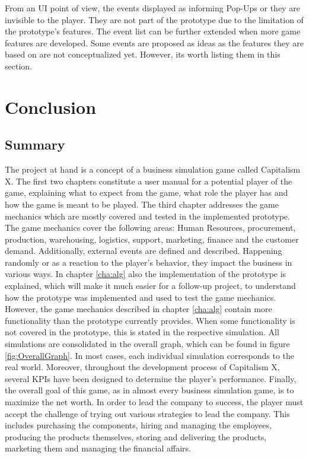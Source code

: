 \documentclass[11pt,titlepage,oneside,openany]{book}
\begin{document}
From an UI point of view, the events displayed as informing Pop-Ups or they are invisible to the player. They are not part of the prototype due to the limitation of the prototype's features. The event list can be further extended when more game features are developed. Some events are proposed as ideas as the features they are based on are not conceptualized yet. However, its worth listing them in this section. 



\chapter{Conclusion}
\label{sec:conclusion}

\section{Summary}
\label{sec:summary}
The project at hand is a concept of a business simulation game called Capitalism X. The first two chapters constitute a user manual for a potential player of the game, explaining what to expect from the  game, what role the player has and how the game is meant to be played. The third chapter addresses the game mechanics which are mostly covered and tested in the implemented prototype. The game mechanics cover the following areas: Human Resources, procurement, production, warehousing, logistics, support, marketing, finance and the customer demand. Additionally, external events are defined and described. Happening randomly or as a reaction to the player's behavior, they impact the business in various ways. 
In chapter \ref{cha:alg} also the implementation of the prototype is explained, which will make it much easier for a follow-up project, to understand how the prototype was implemented and used to test the game mechanics. 
However, the game mechanics described in chapter \ref{cha:alg} contain more functionality than the prototype currently provides. When some functionality is not covered in the prototype, this is stated in the respective simulation. All simulations are consolidated in the overall graph, which can be found in figure \ref{fig:OverallGraph}. In most cases, each individual simulation corresponds to the real world.
Moreover, throughout the development process of Capitalism X, several KPIs have been designed to determine the player's performance. Finally, the overall goal of this game, as in almost every business simulation game, is to maximize the net worth. In order to lead the company to success, the player must accept the challenge of trying out various strategies to lead the company. This includes purchasing the components, hiring and managing the employees, producing the products themselves, storing and delivering the products, marketing them and managing the financial affairs. 
\end{document}
